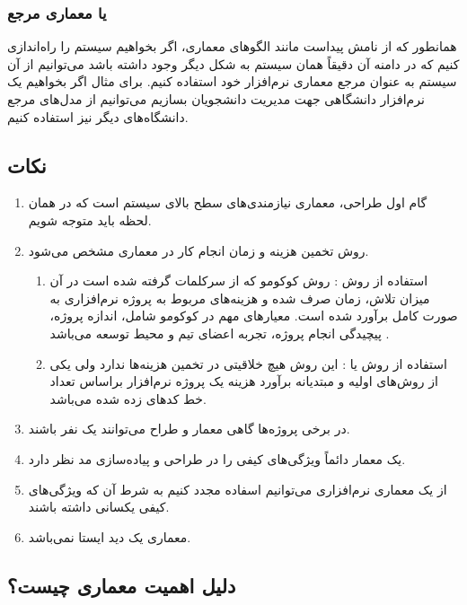 \subsubsection{ یا معماری مرجع}

همانطور که از نامش پیداست مانند الگو‌های معماری، اگر بخواهیم سیستم را راه‌اندازی
کنیم که در دامنه آن دقیقاً همان سیستم به شکل دیگر وجود داشته باشد می‌توانیم از
آن سیستم به عنوان مرجع معماری نرم‌افزار خود استفاده کنیم. برای مثال اگر بخواهیم
یک نرم‌افزار دانشگاهی جهت مدیریت دانشجویان بسازیم می‌توانیم از مدل‌های مرجع
دانشگاه‌های دیگر نیز استفاده کنیم.

\subsection*{نکات}

\begin{enumerate}
    \item گام اول طراحی، معماری نیازمندی‌های سطح بالای سیستم است که در همان لحظه
    باید متوجه شویم.
    \item روش تخمین هزینه و زمان انجام کار در معماری مشخص می‌شود.
    \begin{enumerate}
        \item استفاده از روش : روش کوکومو که از سرکلمات
         گرفته شده است در آن میزان تلاش، زمان صرف
        شده و هزینه‌های مربوط به پروژه نرم‌افزاری به صورت کامل برآورد شده است.
        معیار‌های مهم در کوکومو شامل، اندازه پروژه، پیچیدگی انجام پروژه، تجربه
        اعضای تیم و محیط توسعه می‌باشد \cite{COCOMO}.
        \item استفاده از روش  یا : این روش هیچ خلاقیتی
        در تخمین هزینه‌ها ندارد ولی یکی از روش‌های اولیه و مبتدیانه برآورد هزینه
        یک پروژه نرم‌افزار براساس تعداد خط کد‌های زده شده می‌باشد.
    \end{enumerate}
    \item در برخی پروژه‌ها گاهی معمار و طراح می‌توانند یک نفر باشند.
    \item یک معمار دائماً ویژگی‌های کیفی را در طراحی و پیاده‌سازی مد نظر دارد.
    \item از یک معماری نرم‌افزاری می‌توانیم اسفاده مجدد کنیم به شرط آن که
    ویژگی‌های کیفی یکسانی داشته باشند.
    \item معماری یک دید ایستا نمی‌باشد.
\end{enumerate}

\subsection{دلیل اهمیت معماری چیست؟}

